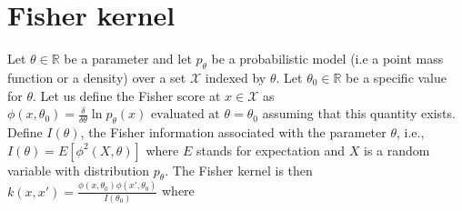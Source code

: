 \documentclass[11pt]{article}
\begin{document}
\section{Fisher kernel} 
Let $\theta \in \mathbb{R}$ be a parameter and let $p_\theta$ be a probabilistic model (i.e a point mass function or a density) over a set $\mathcal{X}$ indexed by $\theta$. Let $\theta_0 \in \mathbb{R}$ be a specific value for $\theta$.
Let us define the Fisher score at $x \in \mathcal{X}$ as
$\phi(x,\theta_0) = \frac{\delta}{\delta \theta} \ln p_\theta(x) \mbox{ evaluated at } \theta=\theta_0$
assuming that this quantity exists. 
Define $I(\theta)$, the Fisher information associated with the parameter $\theta$, i.e., 
$I(\theta)=E[\phi^2(X,\theta)]$
where $E$ stands for expectation and $X$ is a random variable with distribution $p_\theta$. 
The Fisher kernel is then 
$k(x,x')=\frac{\phi(x,\theta_0)\phi(x',\theta_0)}{I(\theta_0)}$
where 
\end{document}
